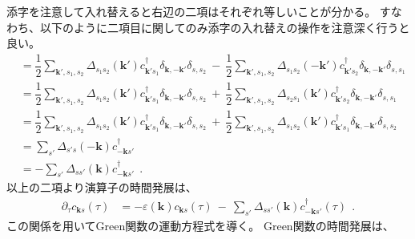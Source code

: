 \documentclass[a4j]{jsarticle}
\begin{document}
添字を注意して入れ替えると右辺の二項はそれぞれ等しいことが分かる。
すなわち、以下のように二項目に関してのみ添字の入れ替えの操作を注意深く行うと良い。
\begin{align}
	[ \mathcal{H}_{\rm BCS} \ , \ c_{\bm{k}s} ]
	 & =
	\dfrac{1}{2}
	\sum_{\bm{k}',s_{1},s_{2}}
	\Delta_{ s_{1} s_{2} }( \bm{k}' )
	c_{\bm{k}' s_{1}}^{\dagger}
	\delta_{\bm{k},-\bm{k}'}
	\delta_{s,s_{2}}
	\ - \
	\dfrac{1}{2}
	\sum_{\bm{k}',s_{1},s_{2}}
	\Delta_{ s_{1} s_{2} }( - \bm{k}' )
	c_{\bm{k}' s_{2}}^{\dagger}
	\delta_{\bm{k},-\bm{k}'}
	\delta_{s,s_{1}}
	\nonumber \\[2mm] &=
	\dfrac{1}{2}
	\sum_{\bm{k}',s_{1},s_{2}}
	\Delta_{ s_{1} s_{2} }( \bm{k}' )
	c_{\bm{k}' s_{1}}^{\dagger}
	\delta_{\bm{k},-\bm{k}'}
	\delta_{s,s_{2}}
	\ + \
	\dfrac{1}{2}
	\sum_{\bm{k}',s_{1},s_{2}}
	\Delta_{ s_{2} s_{1} }( \bm{k}' )
	c_{\bm{k}' s_{2}}^{\dagger}
	\delta_{\bm{k},-\bm{k}'}
	\delta_{s,s_{1}}
	\nonumber \\[2mm] &=
	\dfrac{1}{2}
	\sum_{\bm{k}',s_{1},s_{2}}
	\Delta_{ s_{1} s_{2} }( \bm{k}' )
	c_{\bm{k}' s_{1}}^{\dagger}
	\delta_{\bm{k},-\bm{k}'}
	\delta_{s,s_{2}}
	\ + \
	\dfrac{1}{2}
	\sum_{\bm{k}',s_{1},s_{2}}
	\Delta_{ s_{1} s_{2} }( \bm{k}' )
	c_{\bm{k}' s_{1}}^{\dagger}
	\delta_{\bm{k},-\bm{k}'}
	\delta_{s,s_{2}}
	\nonumber \\[2mm] &=
	\sum_{ s' }
	\Delta_{ s' s }( - \bm{k} )
	c_{ - \bm{k} s'}^{\dagger}
	\nonumber \\[2mm] &=
	-
	\sum_{ s' }
	\Delta_{ s s' }( \bm{k} )
	c_{ - \bm{k} s'}^{\dagger}
	\ \ .
\end{align}
以上の二項より演算子の時間発展は、
\begin{align}
	\partial_{\tau}
	c_{\bm{k}s} (\tau)
	 & =
	-
	\varepsilon( \bm{k} )
	c_{\bm{k} s} (\tau)
	\ - \
	\sum_{ s' }
	\Delta_{ s s' }( \bm{k} )
	c_{ - \bm{k} s'}^{\dagger} ( \tau )
	\ \ .
	\label{eqn:enzansihattenntime}
\end{align}
この関係を用いてGreen関数の運動方程式を導く。
Green関数の時間発展は、
\end{document}
